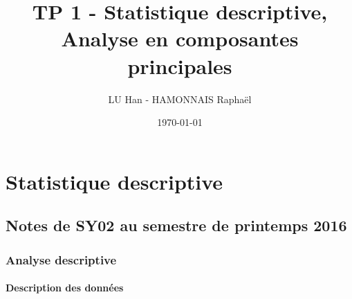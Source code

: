 \documentclass[a4paper,10pt]{report}
\title{TP 1 - Statistique descriptive, Analyse en composantes principales}
\author{LU Han - HAMONNAIS Raphaël}
\date{\today}
\begin{document}
\renewcommand{\labelitemi}{\large\textcolor{tatoebagreen}{\fg}}
\groovypdtitre
\restoregeometry %


\tableofcontents




\chapter{Statistique descriptive}

\section{Notes de SY02 au semestre de printemps 2016}

\subsection{Analyse descriptive}

\subsubsection{Description des données}
\end{document}
